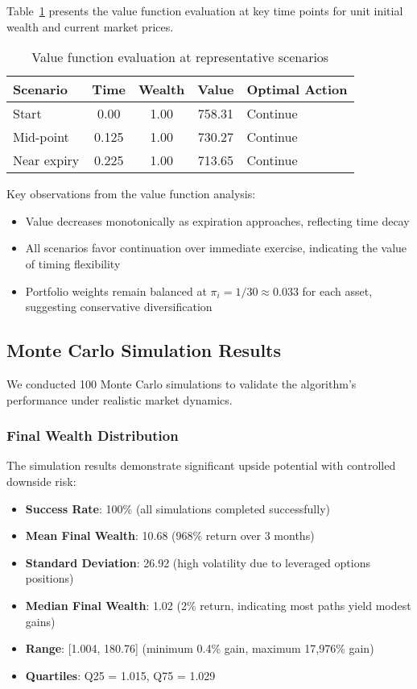 \documentclass[11pt]{article}
\begin{document}
Table~\ref{tab:value_scenarios} presents the value function evaluation at key time points for unit initial wealth and current market prices.

\begin{table}[h]
\centering
\begin{tabular}{lcccl}
\toprule
\textbf{Scenario} & \textbf{Time} & \textbf{Wealth} & \textbf{Value} & \textbf{Optimal Action} \\
\midrule
Start & 0.00 & 1.00 & 758.31 & Continue \\
Mid-point & 0.125 & 1.00 & 730.27 & Continue \\
Near expiry & 0.225 & 1.00 & 713.65 & Continue \\
\bottomrule
\end{tabular}
\caption{Value function evaluation at representative scenarios}
\label{tab:value_scenarios}
\end{table}

Key observations from the value function analysis:
\begin{itemize}
\item Value decreases monotonically as expiration approaches, reflecting time decay
\item All scenarios favor continuation over immediate exercise, indicating the value of timing flexibility
\item Portfolio weights remain balanced at $\pi_i = 1/30 \approx 0.033$ for each asset, suggesting conservative diversification
\end{itemize}

\subsection{Monte Carlo Simulation Results}

We conducted 100 Monte Carlo simulations to validate the algorithm's performance under realistic market dynamics.

\subsubsection{Final Wealth Distribution}
The simulation results demonstrate significant upside potential with controlled downside risk:

\begin{itemize}
\item \textbf{Success Rate}: 100\% (all simulations completed successfully)
\item \textbf{Mean Final Wealth}: 10.68 (968\% return over 3 months)
\item \textbf{Standard Deviation}: 26.92 (high volatility due to leveraged options positions)
\item \textbf{Median Final Wealth}: 1.02 (2\% return, indicating most paths yield modest gains)
\item \textbf{Range}: [1.004, 180.76] (minimum 0.4\% gain, maximum 17,976\% gain)
\item \textbf{Quartiles}: Q25 = 1.015, Q75 = 1.029
\end{itemize}
\end{document}
